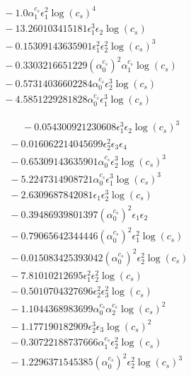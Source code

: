 \documentclass[10pt]{article}
\begin{document}
\begin{align*}
&{}  - 1.0 \alpha_{1}^{c_s} \epsilon_{1}^{2} \log{\left(c_{s} \right)}^{4} \\
&{}  - 13.260103415181 \epsilon_{1}^{3} \epsilon_{2} \log{\left(c_{s} \right)} \\
&{}  - 0.15309143635901 \epsilon_{1}^{2} \epsilon_{2}^{2} \log{\left(c_{s} \right)}^{3} \\
&{}  - 0.3303216651229 \left(\alpha_{0}^{c_s}\right)^{2} \alpha_{1}^{c_s} \log{\left(c_{s} \right)} \\
&{}  - 0.57314036602284 \alpha_{0}^{c_s} \epsilon_{2}^{3} \log{\left(c_{s} \right)} \\
&{}  - 4.5851229281828 \alpha_{0}^{c_s} \epsilon_{1}^{3} \log{\left(c_{s} \right)}
\end{align*}

\begin{align*}
\phantom{F_{s,4}} &\phantom{={}}{}  - 0.054300921230608 \epsilon_{1}^{3} \epsilon_{2} \log{\left(c_{s} \right)}^{3} \\
&{}  - 0.016062214045699 \epsilon_{2}^{2} \epsilon_{3} \epsilon_{4} \\
&{}  - 0.65309143635901 \alpha_{0}^{c_s} \epsilon_{2}^{3} \log{\left(c_{s} \right)}^{3} \\
&{}  - 5.2247314908721 \alpha_{0}^{c_s} \epsilon_{1}^{3} \log{\left(c_{s} \right)}^{3} \\
&{}  - 2.6309687842081 \epsilon_{1} \epsilon_{2}^{3} \log{\left(c_{s} \right)} \\
&{}  - 0.39486939801397 \left(\alpha_{0}^{c_s}\right)^{2} \epsilon_{1} \epsilon_{2} \\
&{}  - 0.79065642344446 \left(\alpha_{0}^{c_s}\right)^{2} \epsilon_{1}^{2} \log{\left(c_{s} \right)} \\
&{}  - 0.015083425393042 \left(\alpha_{0}^{c_s}\right)^{2} \epsilon_{2}^{2} \log{\left(c_{s} \right)} \\
&{}  - 7.81010212695 \epsilon_{1}^{2} \epsilon_{2}^{2} \log{\left(c_{s} \right)} \\
&{}  - 0.5010704327696 \epsilon_{2}^{2} \epsilon_{3}^{2} \log{\left(c_{s} \right)} \\
&{}  - 1.1044368983699 \alpha_{0}^{c_s} \alpha_{2}^{c_s} \log{\left(c_{s} \right)}^{2} \\
&{}  - 1.177190182909 \epsilon_{2}^{3} \epsilon_{3} \log{\left(c_{s} \right)}^{2} \\
&{}  - 0.30722188737666 \alpha_{1}^{c_s} \epsilon_{2}^{2} \log{\left(c_{s} \right)} \\
&{}  - 1.2296371545385 \left(\alpha_{0}^{c_s}\right)^{2} \epsilon_{2}^{2} \log{\left(c_{s} \right)}^{3} \\

\end{align*}
\end{document}
